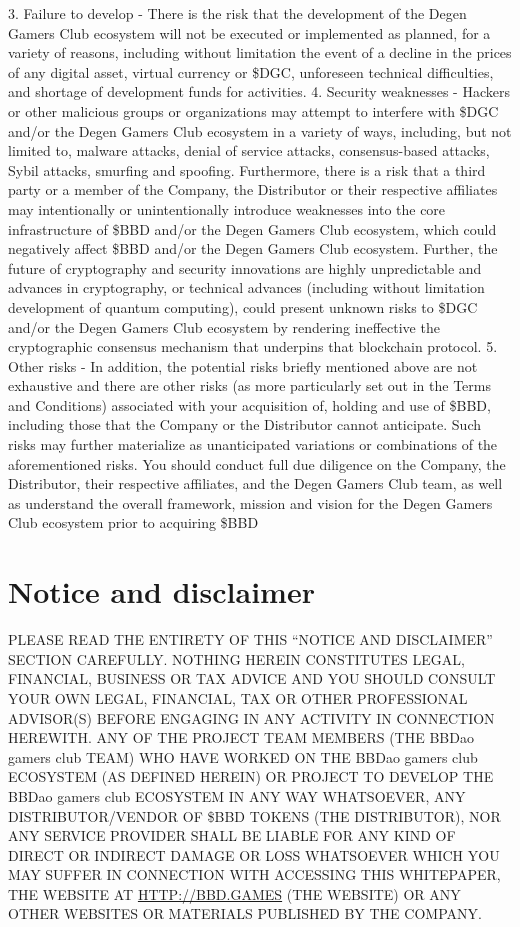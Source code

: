 \documentclass[
]{book}
\begin{document}
3. Failure to develop - There is the risk that the development of the Degen Gamers Club ecosystem will not be executed or implemented as planned, for a variety of reasons, including without limitation the event of a decline in the prices of any digital asset, virtual currency or \$DGC, unforeseen technical difficulties, and shortage of development funds for activities.
4. Security weaknesses - Hackers or other malicious groups or organizations may attempt to interfere with \$DGC and/or the Degen Gamers Club ecosystem in a variety of ways, including, but not limited to, malware attacks, denial of service attacks, consensus-based attacks, Sybil attacks, smurfing and spoofing. Furthermore, there is a risk that a third party or a member of the Company, the Distributor or their respective affiliates may intentionally or unintentionally introduce weaknesses into the core infrastructure of \$BBD and/or the Degen Gamers Club ecosystem, which could negatively affect \$BBD and/or the Degen Gamers Club ecosystem. Further, the future of cryptography and security innovations are highly unpredictable and advances in cryptography, or technical advances (including without limitation development of quantum computing), could present unknown risks to \$DGC and/or the Degen Gamers Club ecosystem by rendering ineffective the cryptographic consensus mechanism that underpins that blockchain protocol.
5. Other risks - In addition, the potential risks briefly mentioned above are not exhaustive and there are other risks (as more particularly set out in the Terms and Conditions) associated with your acquisition of, holding and use of \$BBD, including those that the Company or the Distributor cannot anticipate. Such risks may further materialize as unanticipated variations or combinations of the aforementioned risks. You should conduct full due diligence on the Company, the Distributor, their respective affiliates, and the Degen Gamers Club team, as well as understand the overall framework, mission and vision for the Degen Gamers Club ecosystem prior to acquiring \$BBD

\hypertarget{notice-and-disclaimer}{%
\chapter{Notice and disclaimer}\label{notice-and-disclaimer}}

PLEASE READ THE ENTIRETY OF THIS ``NOTICE AND DISCLAIMER'' SECTION CAREFULLY. NOTHING HEREIN CONSTITUTES LEGAL, FINANCIAL, BUSINESS OR TAX ADVICE AND YOU SHOULD CONSULT YOUR OWN LEGAL, FINANCIAL, TAX OR OTHER PROFESSIONAL ADVISOR(S) BEFORE ENGAGING IN ANY ACTIVITY IN CONNECTION HEREWITH. ANY OF THE PROJECT TEAM MEMBERS (THE BBDao gamers club TEAM) WHO HAVE WORKED ON THE BBDao gamers club ECOSYSTEM (AS DEFINED HEREIN) OR PROJECT TO DEVELOP THE BBDao gamers club ECOSYSTEM IN ANY WAY WHATSOEVER, ANY DISTRIBUTOR/VENDOR OF \$BBD TOKENS (THE DISTRIBUTOR), NOR ANY SERVICE PROVIDER SHALL BE LIABLE FOR ANY KIND OF DIRECT OR INDIRECT DAMAGE OR LOSS WHATSOEVER WHICH YOU MAY SUFFER IN CONNECTION WITH ACCESSING THIS WHITEPAPER, THE WEBSITE AT \url{HTTP://BBD.GAMES} (THE WEBSITE) OR ANY OTHER WEBSITES OR MATERIALS PUBLISHED BY THE COMPANY.
\end{document}
